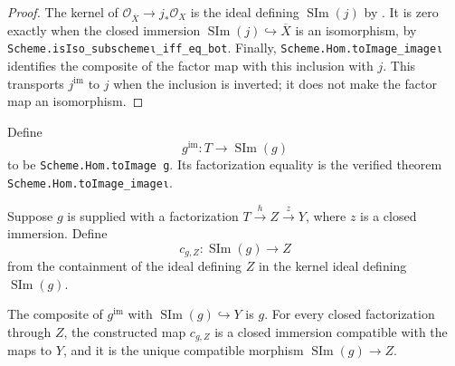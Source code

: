 \begin{proof}
  The kernel of $\mathcal O_{\overline X}\to j_*\mathcal O_X$ is the ideal
  defining $\operatorname{SIm}(j)$ by
  .  It is zero exactly when the
  closed immersion $\operatorname{SIm}(j)\hookrightarrow\overline X$ is an
  isomorphism, by
  \texttt{Scheme.isIso\_subschemeι\_iff\_eq\_bot}.  Finally,
  \texttt{Scheme.Hom.toImage\_imageι} identifies the composite of the factor
  map with this inclusion with $j$.  This transports $j^{\mathrm{im}}$ to
  $j$ when the inclusion is inverted; it does not make the factor map an
  isomorphism.
\end{proof}

\begin{definition}
  \label{def:nagata-scheme-image-factor}

  Define
  \[
    g^{\mathrm{im}}\colon T\longrightarrow\operatorname{SIm}(g)
  \]
  to be \texttt{Scheme.Hom.toImage g}.  Its factorization equality is the
  verified theorem \texttt{Scheme.Hom.toImage\_imageι}.
\end{definition}

\begin{definition}
  \label{def:nagata-scheme-image-comparison}

  Suppose $g$ is supplied with a factorization
  $T\xrightarrow{h}Z\xrightarrow{z}Y$, where $z$ is a closed immersion.
  Define
  \[
    c_{g,Z}\colon\operatorname{SIm}(g)\longrightarrow Z
  \]
  from the containment of the ideal defining $Z$ in the kernel ideal defining
  $\operatorname{SIm}(g)$.
  \end{definition}

\begin{lemma}
  \label{lemma:nagata-scheme-image-universal}

  The composite of $g^{\mathrm{im}}$ with
  $\operatorname{SIm}(g)\hookrightarrow Y$ is $g$.  For every closed
  factorization through $Z$, the constructed map $c_{g,Z}$ is a closed
  immersion compatible with the maps to $Y$, and it is the unique compatible
  morphism $\operatorname{SIm}(g)\to Z$.
\end{lemma}

